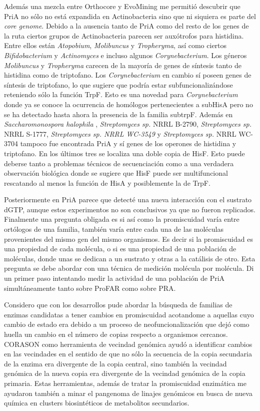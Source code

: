 \documentclass[12pt,twoside]{reedthesis}
\begin{document}
  Además una mezcla entre Orthocore y EvoMining me permitió descubrir que
  PriA no sólo no está expandida en Actinobacteria sino que ni siquiera es
  parte del \emph{core genome}. Debido a la ausencia tanto de PriA como
  del resto de los genes de la ruta ciertos grupos de Actinobacteria
  parecen ser auxótrofos para histidina. Entre ellos están
  \emph{Atopobium}, \emph{Molibuncus} y \emph{Tropheryma}, así como
  ciertos \emph{Bifidobacterium} y \emph{Actinomyces} e incluso algunos
  \emph{Corynebacterium}. Los géneros \emph{Molibuncus} y
  \emph{Tropheryma} carecen de la mayoría de genes de síntesis tanto de
  histidina como de triptofano. Los \emph{Corynebacterium} en cambio sí
  poseen genes de síntesis de triptofano, lo que sugiere que podría estar
  subfuncionalizándose reteniendo sólo la función TrpF. Esto es una
  novedad para \emph{Corynebacterium} donde ya se conoce la ocurrencia de
  homólogos pertenecientes a subHisA pero no se ha detectado hasta ahora
  la presencia de la familia subtrpF. Además en \emph{Saccharomonospora
  halophila} , \emph{Streptomyces sp.} NRRL B-2790, \emph{Streptomyces
  sp.} NRRL S-1777, \emph{Streptomyces sp. NRRL WC-3549} y
  \emph{Streptomyces sp.} NRRL WC-3704 tampoco fue encontrada PriA y sí
  genes de los operones de histidina y triptofano. En los últimos tres se
  localiza una doble copia de HisF. Esto puede deberse tanto a problemas
  técnicos de secuenciación como a una verdadera observación biológica
  donde se sugiere que HisF puede ser multifuncional rescatando al menos
  la función de HisA y posiblemente la de TrpF.
  
  Posteriormente en PriA parece que detecté una nueva interacción con el
  sustrato dGTP, aunque estos experimentos no son conclusivos ya que no
  fueron replicados. Finalmente una pregunta obligada es si así como la
  promiscuidad varía entre ortólogos de una familia, también varía entre
  cada una de las moléculas provenientes del mismo gen del mismo
  organismos. Es decir si la promiscuidad es una propiedad de cada
  molécula, o si es una propiedad de una población de moléculas, donde
  unas se dedican a un sustrato y otras a la catálisis de otro. Esta
  pregunta se debe abordar con una técnica de medición molécula por
  molécula. Di un primer paso intentando medir la actividad de una
  población de PriA simultáneamente tanto sobre ProFAR como sobre PRA.
  
  Considero que con los desarrollos pude abordar la búsqueda de familias
  de enzimas candidatas a tener cambios en promiscuidad acotandome a
  aquellas cuyo cambio de estado era debido a un proceso de
  neofuncionalización que dejó como huella un cambio en el número de
  copias respecto a organismos cercanos. CORASON como herramienta de
  vecindad genómica ayudó a identificar cambios en las vecindades en el
  sentido de que no sólo la secuencia de la copia secundaria de la enzima
  era divergente de la copia central, sino también la vecindad genómica de
  la nueva copia era divergente de la vecindad genómica de la copia
  primaria. Estas herramientas, además de tratar la promiscuidad
  enzimática me ayudaron también a minar el pangenoma de linajes genómicos
  en busca de nueva química en clusters biosintéticos de metabolitos
  secundarios.
  
\end{document}
